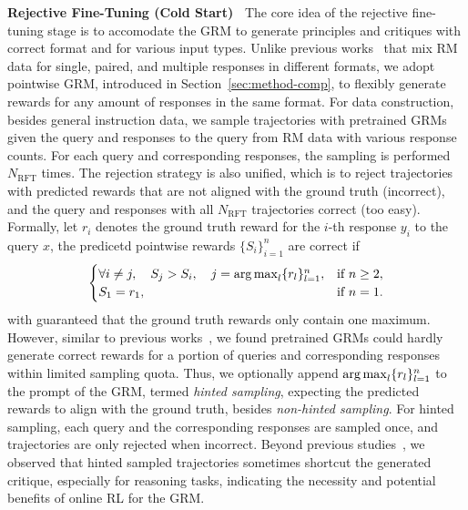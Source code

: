 \documentclass{article} %
\begin{document}
\noindent\textbf{Rejective Fine-Tuning (Cold Start)\ } 
The core idea of the rejective fine-tuning stage is to accomodate the GRM to generate principles and critiques with correct format and for various input types. Unlike previous works~\citep{vu-etal-2024-foundational,cao2024compassjudger1allinonejudgemodel,alexandru2025atlaseleneminigeneral} that mix RM data for single, paired, and multiple responses in different formats, we adopt pointwise GRM, introduced in Section~\ref{sec:method-comp}, to flexibly generate rewards for any amount of responses in the same format. For data construction, besides general instruction data, we sample trajectories with pretrained GRMs given the query and responses to the query from RM data with various response counts. For each query and corresponding responses, the sampling is performed $N_{\mathrm{RFT}}$ times. The rejection strategy is also unified, which is to reject trajectories with predicted rewards that are not aligned with the ground truth (incorrect), and the query and responses with all $N_{\mathrm{RFT}}$ trajectories correct (too easy). 
Formally, let $r_i$ denotes the ground truth reward for the $i$-th response $y_i$ to the query $x$, the predicetd pointwise rewards $\{S_i\}_{i=1}^n$ are correct if
\begin{equation}\label{eq:rft-correct}
\begin{cases}
\forall i \neq j, \quad S_j > S_i, \quad j = \operatorname*{arg\,max}_{l} \{r_l\}_{l=1}^n,  & \text{if } n \geq 2, \\
S_1 = r_1, & \text{if } n = 1.
\end{cases}
\end{equation}
with guaranteed that the ground truth rewards only contain one maximum. However, similar to previous works~\citep{zhang2025generative}, we found pretrained GRMs could hardly generate correct rewards for a portion of queries and corresponding responses within limited sampling quota. Thus, we optionally append $\operatorname*{arg\,max}_{l} \{r_l\}_{l=1}^n$ to the prompt of the GRM, termed \emph{hinted sampling}, expecting the predicted rewards to align with the ground truth, besides \emph{non-hinted sampling}. For hinted sampling, each query and the corresponding responses are sampled once, and trajectories are only rejected when incorrect. Beyond previous studies~\citep{li2024generative,mahan2024generativerewardmodels}, we observed that hinted sampled trajectories sometimes shortcut the generated critique, especially for reasoning tasks, indicating the necessity and potential benefits of online RL for the GRM. 
\end{document}
